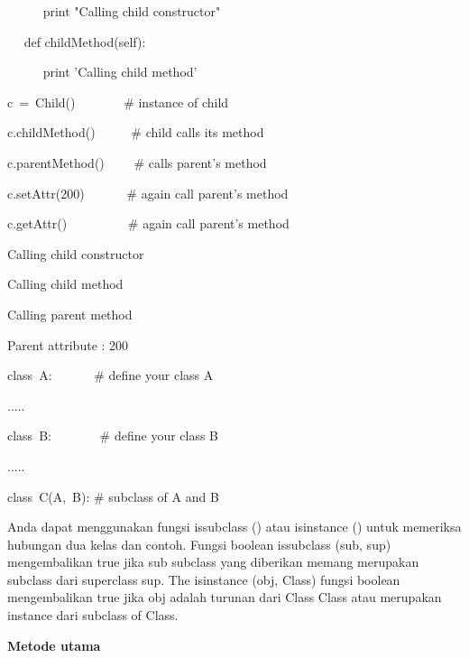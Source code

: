\begin{12pt}
\begin{12pt}
\begin{12pt}
\begin{12pt}
\begin{12pt}
\begin{12pt}
\begin{12pt}
\begin{12pt}
\begin{12pt}
\begin{12pt}
\begin{12pt}
\begin{12pt}
\begin{12pt}
\begin{12pt}
\begin{12pt}
\begin{12pt}
\noindent 
~~~~~ print "Calling child constructor" \par
\vspace{12pt}
\noindent 
~~ def childMethod(self): \par
\noindent 
~~~~~ print 'Calling child method' \par
\vspace{12pt}
\noindent 
c~=~Child()~~~~~~~    $  \#  $ instance of child \par
\noindent 
c.childMethod()~~~~~  $  \#  $ child calls its method \par
\noindent 
c.parentMethod()~~~~  $  \#  $ calls parent's method \par
\noindent 
c.setAttr(200)~~~~~~  $  \#  $ again call parent's method \par
\noindent 
c.getAttr()~~~~~~~~~  $  \#  $ again call parent's method \par
\vspace{12pt}
\noindent 
Calling child constructor \par
\noindent 
Calling child method \par
\noindent 
Calling parent method \par
\noindent 
Parent attribute : 200 \par
\vspace{12pt}
\noindent 
class~A:~~~~~~   $  \#  $ define your class A \par
\noindent 
..... \par
\vspace{12pt}
\noindent 
class~B:~~~~~~~   $  \#  $ define your class B \par
\noindent 
..... \par
\vspace{12pt}
\noindent 
class~C(A,~B):    $  \#  $ subclass of A and B \par
\vspace{12pt}
Anda dapat menggunakan fungsi issubclass () atau isinstance () untuk memeriksa hubungan dua kelas dan contoh. Fungsi boolean issubclass (sub, sup) mengembalikan true jika sub subclass yang diberikan memang merupakan subclass dari superclass sup. The isinstance (obj, Class) fungsi boolean mengembalikan true jika obj adalah turunan dari Class Class atau merupakan instance dari subclass of Class. \par
\vspace{12pt}
\noindent 
{\fontsize{14pt}{14pt}\selectfont \textbf{Metode utama} \\} \par
\vspace{12pt}

\end{12pt}
\end{12pt}
\end{12pt}
\end{12pt}
\end{12pt}
\end{12pt}
\end{12pt}
\end{12pt}
\end{12pt}
\end{12pt}
\end{12pt}
\end{12pt}
\end{12pt}
\end{12pt}
\end{12pt}
\end{12pt}
